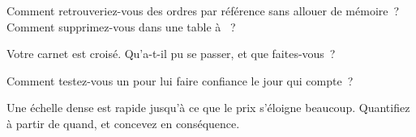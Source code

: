 \begin{interviewq}\label{iq:ll:the-order-book-builder:3}
Comment retrouveriez-vous des ordres par référence sans allouer de mémoire~? Comment supprimez-vous dans une table à ~?
\end{interviewq}

\begin{interviewq}\label{iq:ll:the-order-book-builder:4}
Votre carnet est croisé. Qu'a-t-il pu se passer, et que faites-vous~?
\end{interviewq}

\begin{interviewq}\label{iq:ll:the-order-book-builder:5}
Comment testez-vous un  pour lui faire confiance le jour qui compte~?
\end{interviewq}

\begin{interviewq}\label{iq:ll:the-order-book-builder:6}
Une échelle dense est rapide jusqu'à ce que le prix s'éloigne beaucoup. Quantifiez à partir de quand, et concevez en conséquence.
\end{interviewq}
